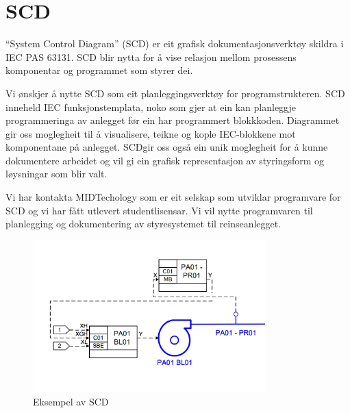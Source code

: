 \section{SCD}
\thispagestyle{fancy}


``System Control Diagram'' (\gls{SCD})  er eit grafisk dokumentasjonsverktøy skildra i \gls{IEC} \gls{PAS} 63131.\newline
 \gls{SCD} blir nytta for å vise relasjon mellom prosessens komponentar og programmet som styrer dei.
 
 Vi ønskjer å nytte \gls{SCD} som eit planleggingsverktøy for programstrukteren. \gls{SCD} inneheld \gls{IEC} funksjonstemplata, noko som gjer at ein kan
 planleggje programmeringa av anlegget før ein har programmert blokkkoden.
 Diagrammet gir oss moglegheit til å visualisere, teikne og kople \gls{IEC}-blokkene mot komponentane på anlegget.
 \gls{SCD}gir oss også ein unik moglegheit for å kunne dokumentere arbeidet og vil gi ein grafisk representasjon
 av styringsform og løysningar som blir valt.

 Vi har kontakta MIDTechology \citep{MIDT} som er eit selskap som utviklar programvare for \gls{SCD} og vi har fått utlevert studentlisensar. 
 Vi vil nytte programvaren til planlegging og dokumentering av styresystemet til reinseanlegget. \newline \newline \newline

 \begin{figure}[htbp]
    \centering
    \includegraphics[width=0.8\textwidth]{Bilder/Visio_eksempel.png}
    \caption{Eksempel av \gls{SCD}}\label{fig:SCD eksempel}    
\end{figure}

\newpage